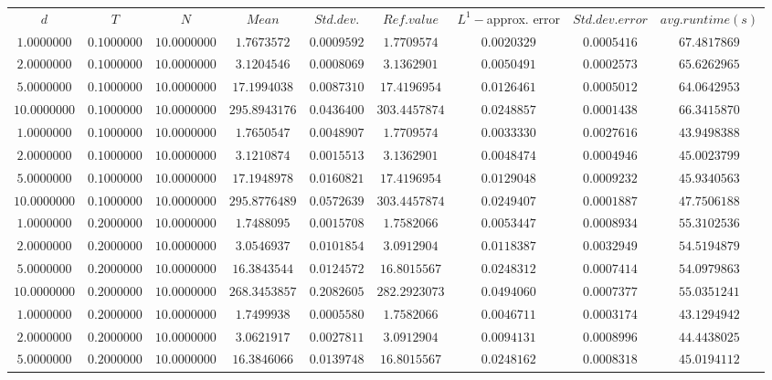 \begin{tabular}{ccccccccc}
$d$ & $T$ & $N$ & $Mean$ & $Std. dev.$ & $Ref. value$ & $L^1-$approx. error & $Std. dev. error$ & $avg. runtime (s)$\\
$1.0000000$ & $0.1000000$ & $10.0000000$ & $1.7673572$ & $0.0009592$ & $1.7709574$ & $0.0020329$ & $0.0005416$ & $67.4817869$\\
$2.0000000$ & $0.1000000$ & $10.0000000$ & $3.1204546$ & $0.0008069$ & $3.1362901$ & $0.0050491$ & $0.0002573$ & $65.6262965$\\
$5.0000000$ & $0.1000000$ & $10.0000000$ & $17.1994038$ & $0.0087310$ & $17.4196954$ & $0.0126461$ & $0.0005012$ & $64.0642953$\\
$10.0000000$ & $0.1000000$ & $10.0000000$ & $295.8943176$ & $0.0436400$ & $303.4457874$ & $0.0248857$ & $0.0001438$ & $66.3415870$\\
$1.0000000$ & $0.1000000$ & $10.0000000$ & $1.7650547$ & $0.0048907$ & $1.7709574$ & $0.0033330$ & $0.0027616$ & $43.9498388$\\
$2.0000000$ & $0.1000000$ & $10.0000000$ & $3.1210874$ & $0.0015513$ & $3.1362901$ & $0.0048474$ & $0.0004946$ & $45.0023799$\\
$5.0000000$ & $0.1000000$ & $10.0000000$ & $17.1948978$ & $0.0160821$ & $17.4196954$ & $0.0129048$ & $0.0009232$ & $45.9340563$\\
$10.0000000$ & $0.1000000$ & $10.0000000$ & $295.8776489$ & $0.0572639$ & $303.4457874$ & $0.0249407$ & $0.0001887$ & $47.7506188$\\
$1.0000000$ & $0.2000000$ & $10.0000000$ & $1.7488095$ & $0.0015708$ & $1.7582066$ & $0.0053447$ & $0.0008934$ & $55.3102536$\\
$2.0000000$ & $0.2000000$ & $10.0000000$ & $3.0546937$ & $0.0101854$ & $3.0912904$ & $0.0118387$ & $0.0032949$ & $54.5194879$\\
$5.0000000$ & $0.2000000$ & $10.0000000$ & $16.3843544$ & $0.0124572$ & $16.8015567$ & $0.0248312$ & $0.0007414$ & $54.0979863$\\
$10.0000000$ & $0.2000000$ & $10.0000000$ & $268.3453857$ & $0.2082605$ & $282.2923073$ & $0.0494060$ & $0.0007377$ & $55.0351241$\\
$1.0000000$ & $0.2000000$ & $10.0000000$ & $1.7499938$ & $0.0005580$ & $1.7582066$ & $0.0046711$ & $0.0003174$ & $43.1294942$\\
$2.0000000$ & $0.2000000$ & $10.0000000$ & $3.0621917$ & $0.0027811$ & $3.0912904$ & $0.0094131$ & $0.0008996$ & $44.4438025$\\
$5.0000000$ & $0.2000000$ & $10.0000000$ & $16.3846066$ & $0.0139748$ & $16.8015567$ & $0.0248162$ & $0.0008318$ & $45.0194112$\\

\end{tabular}
